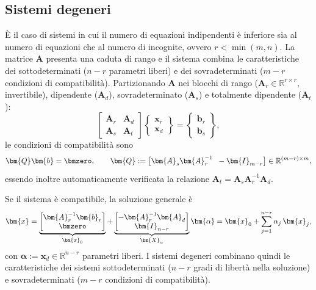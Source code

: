 \subsection{Sistemi degeneri}\label{par:degeneri}

È il caso di sistemi in cui il numero di equazioni indipendenti è inferiore sia al numero di equazioni che al numero di incognite, 
ovvero $r<\min(m,n)$. La matrice $\bm{A}$ presenta una caduta di rango e il sistema combina le caratteristiche dei sottodeterminati ($n-r$ parametri liberi) e dei sovradeterminati ($m-r$ condizioni di compatibilità). Partizionando $\bm{A}$ nei blocchi di rango ($\bm{A}_r \in \mathbb{R}^{r \times r}$, invertibile), dipendente ($\bm{A}_d$), sovradeterminato ($\bm{A}_s$) e totalmente dipendente ($\bm{A}_t$):
\begin{equation}\label{eq:sist_deg}
	\left[ \begin{array}{c|c}
		\bm{A}_r & \bm{A}_d \\
		\hline
		\bm{A}_s & \bm{A}_t
	\end{array} \right]
	\left\{ \begin{array}{c}
		\bm{x}_r \\ \hline \bm{x}_d
	\end{array} \right\} =
	\left\{ \begin{array}{c}
		\bm{b}_r \\ \hline \bm{b}_s
	\end{array} \right\},
\end{equation}
le condizioni di compatibilit\`a sono
\begin{equation}\label{eq:comp_deg}
	\bm{Q} \bm{b} = \bmzero,
	\qquad
	\bm{Q} := \bigl[\bm{A}_{s}\bm{A}_{r}^{-1} \;\; -\bm{I}_{m-r}\bigr] \in \mathbb{R}^{(m-r)\times m},
\end{equation}
essendo inoltre automaticamente verificata la relazione $\bm{A}_t = \bm{A}_s\bm{A}_r^{-1}\bm{A}_d$.

Se il sistema \`e compatibile, la soluzione generale \`e
\begin{equation}\label{eq:sol_deg}
	\bm{x} = \underbrace{\begin{bmatrix} \bm{A}_r^{-1}\bm{b}_r \\ \bmzero \end{bmatrix}}_{\bm{x}_0}
	+ \underbrace{\begin{bmatrix} -\bm{A}_r^{-1}\bm{A}_d \\ \bm{I}_{n-r} \end{bmatrix}}_{\bm{X}_\alpha} \bm{\alpha}	= \bm{x}_0 + \sum_{j=1}^{n-r} \alpha_j\,\bm{x}_j,
\end{equation}
con $\bm{\alpha} := \bm{x}_d \in \mathbb{R}^{n-r}$ parametri liberi. I sistemi degeneri combinano quindi le caratteristiche dei sistemi sottodeterminati ($n-r$ gradi di libert\`a nella soluzione) e sovradeterminati ($m-r$ condizioni di compatibilit\`a).

